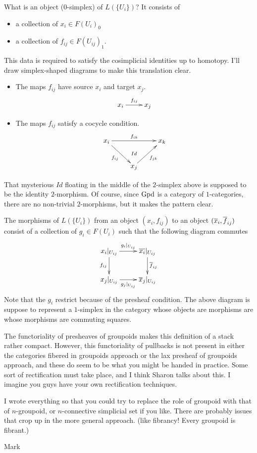 \medskip\noindent
What is an object ($0$-simplex) of $L(\{U_i\})$?  It consists of 
\begin{itemize}
\item a collection of $x_i \in F(U_i)_0$
\item a collection of $f_{ij} \in F(U_{ij})_1$.
\end{itemize}
This data is required to satisfy the cosimplicial identities up to
homotopy.  I'll draw simplex-shaped diagrams to make this translation
clear. 
\begin{itemize}
\item The maps $f_{ij}$ have source $x_i$ and target $x_j$.
$$ 
\xymatrix{
x_i \ar[r]^{f_{ij}} & x_j
}
$$
\item The maps $f_{ij}$ satisfy a cocycle condition.
$$
\xymatrix{
x_i \ar[rr]^{f_{ik}} \ar[rd]_{f_{ij}} & \ar@{}[d]|{Id} & x_k
\\
& x_j \ar[ru]_{f_{jk}} 
}
$$
\end{itemize}
That mysterious $Id$ floating in the middle of the $2$-simplex above is
supposed to be the identity $2$-morphism.  Of course, since $\operatorname{Gpd}$ is a
category of $1$-categories, there are no non-trivial $2$-morphisms, but it
makes the pattern clear.

\medskip\noindent
The morphisms of $L(\{U_i\})$ from an object $(x_i, f_{ij})$ to an object
$(\overline{x}_i, \overline{f}_{ij})$ consist of a collection of $g_i \in F(U_i)$ such
that the following diagram commutes
$$
\xymatrix{
x_i\vert_{U_{ij}} \ar[r]^{g_i\vert_{U_{ij}}} \ar[d]_{f_{ij}} & 
\br{x_i}\vert_{U_{ij}} \ar[d]^{\br{f}_{ij}}
\\
x_j\vert_{U_{ij}} \ar[r]_{g_j\vert_{U_{ij}}} &
\br{x}_j\vert_{U_{ij}}
}
$$
Note that the $g_i$ restrict because of the presheaf condition.  The above
diagram is suppose to represent a $1$-simplex in the category whose objects
are morphisms are whose morphisms are commuting squares.

\medskip\noindent
The functoriality of presheaves of groupoids makes this definition of a
stack rather
compact.  However, this functoriality of pullbacks is not present in either
the categories fibered in groupoids approach or the lax presheaf of
groupoids approach, and these do seem to be what you might be handed in
practice.  Some sort of rectification must take place, and I think Sharon
talks about this.  I imagine you guys have your own rectification
techniques.

\medskip\noindent
I wrote everything so that you could try to replace the role of groupoid
with that of $n$-groupoid, or $n$-connective simplicial set if you like.
There are probably issues that crop up in the more general approach. (like
fibrancy!  Every groupoid is fibrant.)

\medskip\noindent
Mark







